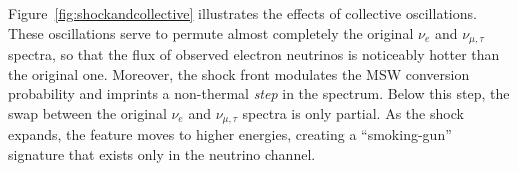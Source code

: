 Figure~\ref{fig:shockandcollective} illustrates the effects of collective oscillations. %
These oscillations serve to permute almost completely the original $\nu_{e}$ and $\nu_{\mu,\tau}$ spectra, so that the flux of observed electron neutrinos is noticeably hotter than the original one. Moreover, the shock front modulates the MSW conversion probability and imprints a non-thermal \emph{step} in the spectrum.  Below this step, the swap between the original $\nu_{e}$ and $\nu_{\mu,\tau}$ spectra is only partial. As the shock expands, the feature moves to higher energies, creating a ``smoking-gun'' signature that exists only in the neutrino channel. 





